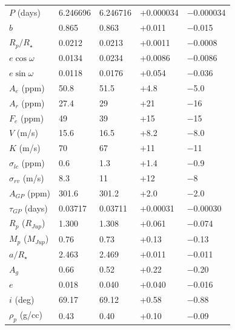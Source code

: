 \documentclass[apjl]{emulateapj}
\begin{document}
\begin{table}
\begin{tabular}{l l l l l}
$P$ 	(days)			&	6.246696		&	6.246716		&	+0.000034	&	$-$0.000034	\\
$b$ 					&	0.865		&	0.863		&	+0.011		&	$-$0.015		\\
$R_{p}/R_{\star}$		&	0.0212		&	0.0213		&	+0.0011		&	$-$0.0008		\\
$e\cos{\omega}$ 		&	0.0134		&	0.0234		&	+0.0086		&	$-$0.0086		\\
$e\sin{\omega}$ 		&	0.0118		&	0.0176		&	+0.054		&	$-$0.036		\\
$A_e$ (ppm)			&	50.8			&	51.5			&	+4.8			&	$-$5.0		\\
$A_r$ (ppm)			&	27.4			&	29			&	+21			&	$-$16		\\
$F_e$ (ppm)			&	49			&	39			&	+15			&	$-$15		\\
$V$ 	(m/s)				&	15.6			&	16.5			&	+8.2			&	$-$8.0		\\
$K$ 	(m/s)				&	70			&	67			&	+11			&	$-$11		\\
$\sigma_{lc}$ (ppm)		&	0.6			&	1.3			&	+1.4			&	$-$0.9		\\
$\sigma_{rv}$ (m/s)		&	8.3			&	11			&	+12			&	$-$8			\\
$A_{GP}$ (ppm)		&	301.6		&	301.2		&	+2.0			&	$-$2.0		\\
$\tau_{GP}$  (days)		&	0.03717		&	0.03711		&	+0.00031		&	$-$0.00030	\\
%
%
\hline
%
$R_{p}$ ($R_{Jup}$) 	&	1.300		&	1.308		&	+0.061		&	$-$0.074		\\
$M_{p}$ ($M_{Jup}$)	&	0.76			&	0.73			&	+0.13		&	$-$0.13		\\
$a/R_{\star}$			&	2.463		&	2.469		&	+0.011		&	$-$0.011		\\
$A_g$				&	0.66			&	0.52			&	+0.22		&	$-$0.20		\\
$e$					&	0.018		&	0.040		&	+0.040		&	$-$0.016		\\
$i$ (deg)				&	69.17		&	69.12		&	+0.58		&	$-$0.88		\\
$\rho_{p}$ (g/cc) 		&	0.43			&	0.40			&	+0.10		&	$-$0.09		\\
\hline
\end{tabular}
\end{table}
\end{document}
